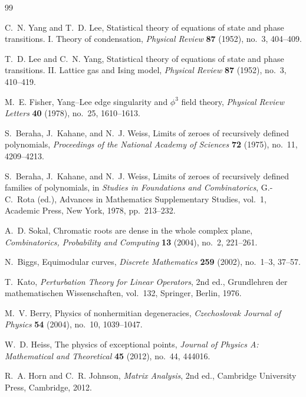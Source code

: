 \begin{thebibliography}{99}

C.~N. Yang and T.~D. Lee,
\newblock Statistical theory of equations of state and phase transitions. {I}. Theory of condensation,
\newblock \emph{Physical Review} \textbf{87} (1952), no.~3, 404--409.

T.~D. Lee and C.~N. Yang,
\newblock Statistical theory of equations of state and phase transitions. {II}. Lattice gas and {I}sing model,
\newblock \emph{Physical Review} \textbf{87} (1952), no.~3, 410--419.

M.~E. Fisher,
\newblock Yang--Lee edge singularity and \(\phi^3\) field theory,
\newblock \emph{Physical Review Letters} \textbf{40} (1978), no.~25, 1610--1613.

S.~Beraha, J.~Kahane, and N.~J. Weiss,
\newblock Limits of zeroes of recursively defined polynomials,
\newblock \emph{Proceedings of the National Academy of Sciences} \textbf{72} (1975), no.~11, 4209--4213.

S.~Beraha, J.~Kahane, and N.~J. Weiss,
\newblock Limits of zeroes of recursively defined families of polynomials,
\newblock in \emph{Studies in Foundations and Combinatorics}, G.-C.~Rota (ed.), Advances in Mathematics Supplementary Studies, vol.~1, Academic Press, New York, 1978, pp.~213--232.

A.~D. Sokal,
\newblock Chromatic roots are dense in the whole complex plane,
\newblock \emph{Combinatorics, Probability and Computing} \textbf{13} (2004), no.~2, 221--261.

N.~Biggs,
\newblock Equimodular curves,
\newblock \emph{Discrete Mathematics} \textbf{259} (2002), no.~1--3, 37--57.

T.~Kato,
\newblock \emph{Perturbation Theory for Linear Operators},
\newblock 2nd ed., Grundlehren der mathematischen Wissenschaften, vol.~132, Springer, Berlin, 1976.

M.~V. Berry,
\newblock Physics of nonhermitian degeneracies,
\newblock \emph{Czechoslovak Journal of Physics} \textbf{54} (2004), no.~10, 1039--1047.

W.~D. Heiss,
\newblock The physics of exceptional points,
\newblock \emph{Journal of Physics A: Mathematical and Theoretical} \textbf{45} (2012), no.~44, 444016.

R.~A. Horn and C.~R. Johnson,
\newblock \emph{Matrix Analysis},
\newblock 2nd ed., Cambridge University Press, Cambridge, 2012.


\end{thebibliography}

